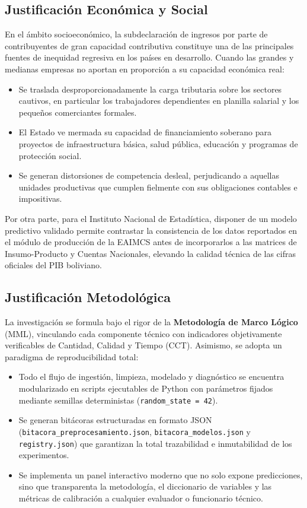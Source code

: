 \subsection{Justificación Económica y Social}
En el ámbito socioeconómico, la subdeclaración de ingresos por parte de contribuyentes de gran capacidad contributiva constituye una de las principales fuentes de inequidad regresiva en los países en desarrollo. Cuando las grandes y medianas empresas no aportan en proporción a su capacidad económica real:
\begin{itemize}
    \item Se traslada desproporcionadamente la carga tributaria sobre los sectores cautivos, en particular los trabajadores dependientes en planilla salarial y los pequeños comerciantes formales.
    \item El Estado ve mermada su capacidad de financiamiento soberano para proyectos de infraestructura básica, salud pública, educación y programas de protección social.
    \item Se generan distorsiones de competencia desleal, perjudicando a aquellas unidades productivas que cumplen fielmente con sus obligaciones contables e impositivas.
\end{itemize}

Por otra parte, para el Instituto Nacional de Estadística, disponer de un modelo predictivo validado permite contrastar la consistencia de los datos reportados en el módulo de producción de la EAIMCS antes de incorporarlos a las matrices de Insumo-Producto y Cuentas Nacionales, elevando la calidad técnica de las cifras oficiales del PIB boliviano.

\subsection{Justificación Metodológica}
La investigación se formula bajo el rigor de la \textbf{Metodología de Marco Lógico} (MML), vinculando cada componente técnico con indicadores objetivamente verificables de Cantidad, Calidad y Tiempo (CCT). Asimismo, se adopta un paradigma de reproducibilidad total:
\begin{itemize}
    \item Todo el flujo de ingestión, limpieza, modelado y diagnóstico se encuentra modularizado en scripts ejecutables de Python con parámetros fijados mediante semillas deterministas (\texttt{random\_state = 42}).
    \item Se generan bitácoras estructuradas en formato JSON (\texttt{bitacora\_pre\-pro\-ce\-sa\-mien\-to.json}, \texttt{bitacora\_modelos.json} y \texttt{registry.json}) que garantizan la total trazabilidad e inmutabilidad de los experimentos.
    \item Se implementa un panel interactivo moderno que no solo expone predicciones, sino que transparenta la metodología, el diccionario de variables y las métricas de calibración a cualquier evaluador o funcionario técnico.
\end{itemize}
